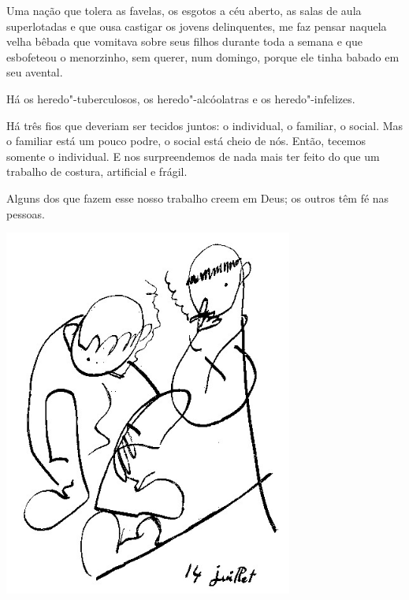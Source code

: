 \bigskip
\bigskip

Uma nação que tolera as favelas, os esgotos a céu aberto, as salas de
aula superlotadas e que ousa castigar os jovens delinquentes, me faz
pensar naquela velha bêbada que vomitava sobre seus filhos durante toda
a semana e que esbofeteou o menorzinho, sem querer, num domingo, porque
ele tinha babado em seu avental.

\bigskip
\bigskip


Há os heredo"-tuberculosos, os heredo"-alcóolatras e os heredo"-infelizes.


\bigskip
\bigskip

Há três fios que deveriam ser tecidos juntos: o individual, o familiar,
o social. Mas o familiar está um pouco podre, o social está cheio de
nós. Então, tecemos somente o individual. E nos surpreendemos de nada
mais ter feito do que um trabalho de costura, artificial e frágil.

\bigskip
\bigskip

Alguns dos que fazem esse nosso trabalho creem em Deus; os outros têm fé
nas pessoas.

\bigskip
\bigskip

\pagebreak
\thispagestyle{empty}

\begin{vplace}[.50]
\begin{center}
\includegraphics[width=95mm]{./imgs/Image_13.jpg}
\end{center}
\end{vplace}

